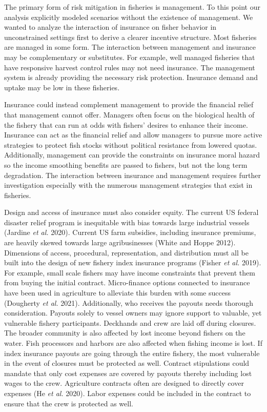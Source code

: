 \documentclass[
  letterpaper,
  DIV=11,
  numbers=noendperiod]{scrartcl}
\theoremstyle{plain}
\theoremstyle{plain}
\theoremstyle{remark}
\begin{document}
The primary form of risk mitigation in fisheries is management. To this
point our analysis explicitly modeled scenarios without the existence of
management. We wanted to analyze the interaction of insurance on fisher
behavior in unconstrained settings first to derive a clearer incentive
structure. Most fisheries are managed in some form. The interaction
between management and insurance may be complementary or substitutes.
For example, well managed fisheries that have responsive harvest control
rules may not need insurance. The management system is already providing
the necessary risk protection. Insurance demand and uptake may be low in
these fisheries.

Insurance could instead complement management to provide the financial
relief that management cannot offer. Managers often focus on the
biological health of the fishery that can run at odds with fishers'
desires to enhance their income. Insurance can act as the financial
relief and allow managers to pursue more active strategies to protect
fish stocks without political resistance from lowered quotas.
Additionally, management can provide the constraints on insurance moral
hazard so the income smoothing benefits are passed to fishers, but not
the long term degradation. The interaction between insurance and
management requires further investigation especially with the numerous
management strategies that exist in fisheries.

Design and access of insurance must also consider equity. The current US
federal disaster relief program is inequitable with bias towards large
industrial vessels (Jardine \emph{et al.} 2020). Current US farm
subsidies, including insurance premiums, are heavily skewed towards
large agribusinesses (White and Hoppe 2012). Dimensions of access,
procedural, representation, and distribution must all be built into the
design of new fishery index insurance programs (Fisher \emph{et al.}
2019). For example, small scale fishers may have income constraints that
prevent them from buying the initial contract. Micro-finance options
connected to insurance have been used in agriculture to alleviate this
burden with some success (Dougherty \emph{et al.} 2021). Additionally,
who receives the payouts needs thorough consideration. Payouts solely to
vessel owners may ignore support to valuable, yet vulnerable fishery
participants. Deckhands and crew are laid off during closures. The
broader community is also affected by lost income beyond fishers on the
water. Fish processors and harbors are also affected when fishing income
is lost. If index insurance payouts are going through the entire
fishery, the most vulnerable in the event of closures must be protected
as well. Contract stipulations could mandate that only cost expenses are
covered by payouts thereby including lost wages to the crew. Agriculture
contracts often are designed to directly cover expenses (He \emph{et
al.} 2020). Labor expenses could be included in the contract to ensure
that the crew is protected as well.
\end{document}

